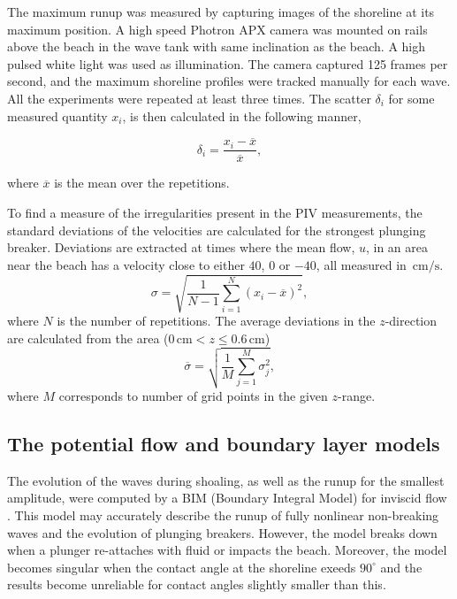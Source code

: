 \documentclass[review, authoryear]{elsarticle}
\newcommand{\cm}{\,\mbox{cm}}
\newcommand{\cmps}{\,\mbox{cm/s}}
\begin{document}
The maximum runup was measured by capturing images of the shoreline at its maximum position. A high speed Photron APX  camera was mounted on rails above the beach in the wave tank with same inclination as the beach. A high pulsed white light was used as illumination. The camera captured 125 frames per second, and the maximum shoreline profiles were tracked manually for each wave. All the experiments were repeated at least three times. The scatter $\delta_i$ for some measured quantity $x_i$, is then calculated in the following manner,

\begin{equation}
\delta_i=\frac{x_i-\overline{x}}{\overline{x}},
\end{equation}

where $\overline{x}$ is the mean over the repetitions.


To find a measure of the irregularities present in the PIV measurements, the standard deviations of the velocities are calculated for the strongest plunging breaker. Deviations are extracted at times where the mean flow, $u$, in an area near the beach has a velocity close to either
$40$, $0$ or $-40$, all measured in $\cmps$.
\begin{equation}
\sigma=\sqrt{\frac{1}{N-1}\sum_{i=1}^{N}(x_i-\overline{x})^2}, 
\end{equation}
where $N$ is the number of repetitions.
The average deviations in the $z$-direction are calculated from the area ($0\cm < z \le 0.6\cm$)
\begin{equation}
\overline{\sigma}=\sqrt{\frac{1}{M}\sum_{j=1}^{M}\sigma_j^2},
\label{av_g}
\end{equation}
where $M$ corresponds to number of  grid points in the given $z$-range.

\subsection{The potential flow and boundary layer models}
The evolution of the waves during shoaling, as well as the runup for the smallest amplitude, were 
computed by a BIM (Boundary Integral Model) for  inviscid flow \citep{pedersen2013runup}. This model may accurately describe the runup of fully nonlinear non-breaking waves and the evolution of plunging breakers.
However, the model breaks down when a plunger re-attaches with fluid or impacts the beach. Moreover, the
model  becomes singular when the contact angle at the shoreline exeeds $90^\circ$  and the results  become unreliable for contact angles slightly smaller than this.  
\end{document}
